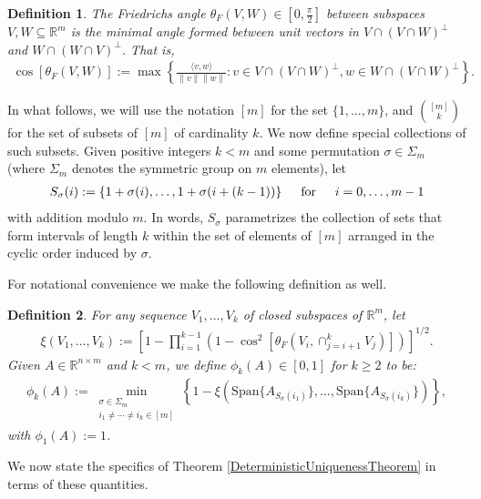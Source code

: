 \documentclass[journal, onecolumn]{IEEEtran}
\newtheorem{definition}{Definition}
\begin{document}
\begin{definition}\label{FriedrichsDefinition}
The \emph{Friedrichs angle} $\theta_F(V,W) \in [0,\frac{\pi}{2}]$ between subspaces $V,W \subseteq \mathbb{R}^m$ is the minimal angle formed between unit vectors in $V \cap (V \cap W)^\perp$ and $W \cap (W \cap V)^\perp$. That is,
\begin{align}
\cos\left[\theta_F(V,W)\right] := \max\left\{ \frac{ \langle v, w \rangle }{\|v\|\|w\|}: v \in V \cap (V \cap W)^\perp, w \in W \cap (V \cap W)^\perp \right\}.
\end{align}
\end{definition}

In what follows, we will use the notation $[m]$ for the set $\{1, ..., m\}$, and ${[m] \choose k}$ for the set of subsets of $[m]$ of cardinality $k$. We now define special collections of such subsets. Given positive integers $k < m$ and some permutation $\sigma \in \Sigma_m$ (where $\Sigma_m$ denotes the symmetric group on $m$ elements), let
\begin{align}
S_\sigma(i) := \{1+\sigma(i), \ldots, 1+\sigma(i + (k-1)) \} \indent \text{for} \indent i = 0, \ldots, m-1
\end{align}
%
with addition modulo $m$. In words, $S_\sigma$ parametrizes the collection of sets that form intervals of length $k$ within the set of elements of $[m]$ arranged in the cyclic order induced by $\sigma$.

For notational convenience we make the following definition as well.

\begin{definition}\label{SpecialSupportSet}
For any sequence $V_1, \ldots, V_k$ of closed subspaces of $\mathbb{R}^m$, let
\begin{align}
\xi(V_1, \ldots, V_k) := \left[1 - \prod_{i=1}^{k-1} \left(1 - \cos^2\left[ \theta_F(V_i, \cap_{j=i+1}^k V_j) \right] \right) \right]^{1/2}.
\end{align}
Given $A \in \mathbb{R}^{n \times m}$ and $k < m$, we define $\phi_k(A) \in [0,1]$ for $k \geq 2$ to be:
\begin{align}\label{rho}
\phi_k(A) := \min_{ \substack{\sigma \in \Sigma_m \\ i_1 \neq \cdots \neq i_k \in [m] } } \left\{ 1 - \xi(\text{Span}\{A_{S_{\sigma}(i_1)}\}, \ldots, \text{Span}\{A_{S_{\sigma}( i_k)}\}) \right\},
\end{align}
%
with $\phi_1(A) := 1$.
\end{definition}

We now state the specifics of Theorem \ref{DeterministicUniquenessTheorem} in terms of these quantities.
\end{document}
